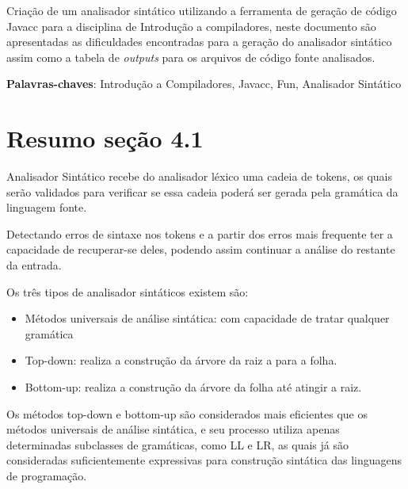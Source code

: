 \documentclass[
	article,			%
	11pt,				%
	oneside,			%
	a4paper,			%
	portuguese,			%
	brazil,				%
	sumario=tradicional
	]{abntex2}
\begin{document}
\frenchspacing 

\maketitle

\begin{resumoumacoluna}
Criação de um analisador sintático utilizando a ferramenta de geração de código Javacc para a disciplina de Introdução a compiladores, neste documento
são apresentadas as dificuldades encontradas para a geração do analisador sintático assim como a tabela de \textit{outputs} para os arquivos de código fonte analisados.

 \vspace{\onelineskip}
 
 \noindent
 \textbf{Palavras-chaves}: Introdução a Compiladores, Javacc, Fun, Analisador Sintático
\end{resumoumacoluna}

\newpage
\tableofcontents*
\newpage
\textual

\section{Resumo seção 4.1}

Analisador Sintático recebe do analisador léxico uma cadeia de tokens, os quais serão validados para verificar se essa cadeia poderá ser gerada pela gramática da linguagem fonte.

Detectando erros de sintaxe nos tokens e a partir dos erros mais frequente ter a capacidade de recuperar-se deles, podendo assim continuar a análise do restante da entrada. 

Os três tipos de analisador sintáticos existem são: 

\begin{itemize}
	\item Métodos universais de análise sintática: com capacidade de tratar qualquer gramática
	\item Top-down: realiza a construção da árvore da raiz a para a folha. 
	\item Bottom-up: realiza a construção da árvore da folha até atingir a raiz. 
\end{itemize}

Os métodos top-down e bottom-up são considerados mais eficientes que os métodos universais de análise sintática, e seu processo utiliza apenas determinadas subclasses de gramáticas, como LL e LR, as quais já são consideradas suficientemente expressivas para construção sintática das linguagens de programação. 
\end{document}

